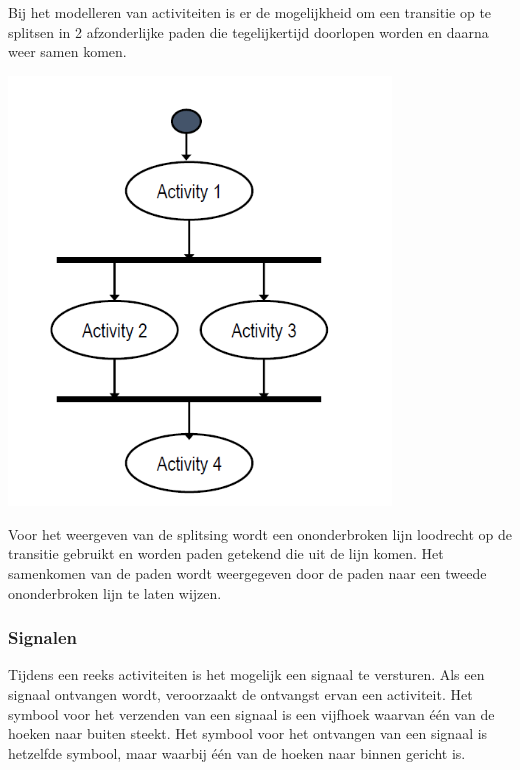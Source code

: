 Bij het modelleren van activiteiten is er de mogelijkheid om een transitie op te splitsen in 2 afzonderlijke paden die tegelijkertijd doorlopen worden en daarna weer samen komen.


\begin{center}
\includegraphics[width=4in]{img/parallelism}%
\end{center}

Voor het weergeven van de splitsing wordt een ononderbroken lijn loodrecht op de transitie gebruikt en worden paden getekend die uit de lijn komen. Het samenkomen van de paden wordt weergegeven door de paden naar een tweede ononderbroken lijn te laten wijzen.

\subsubsection{Signalen}

Tijdens een reeks activiteiten is het mogelijk een signaal te versturen. Als een signaal ontvangen wordt, veroorzaakt de ontvangst ervan een activiteit.
Het symbool voor het verzenden van een signaal is een vijfhoek waarvan één van de hoeken naar buiten steekt. Het symbool voor het ontvangen van een signaal is hetzelfde symbool, maar waarbij één van de hoeken naar binnen gericht is.


